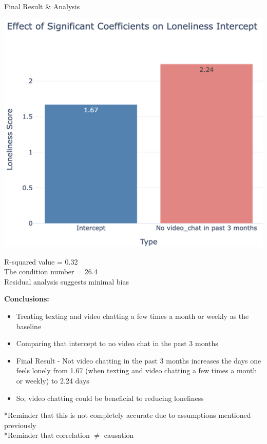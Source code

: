 \documentclass{beamer}
\begin{document}
\begin{frame}{Final Result \& Analysis}

\begin{minipage}[t]{0.6\linewidth} %
    \includegraphics[width=\linewidth]{presentation/Screenshot 2024-12-01 at 1.08.25 PM.png}
\end{minipage}%
R-squared value = 0.32\\
The condition number = 26.4\\
Residual analysis suggests minimal bias\\

\end{frame}

\begin{frame}
\textbf{Conclusions:}\\
\begin{itemize}
    \item  Treating texting and video chatting a few times a month or weekly as the baseline
    \item Comparing that intercept to no video chat in the past 3 months
    \item Final Result - Not video chatting in the past 3 months increases the days one feels lonely from 1.67 (when texting and video chatting a few times a month or weekly) to 2.24 days\\
    \item So, video chatting could be beneficial to reducing loneliness 
\end{itemize}

*Reminder that this is not completely accurate due to assumptions mentioned previously\\
*Reminder that correlation $\neq$ causation
\end{frame}
\end{document}
